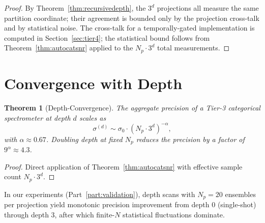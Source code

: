\documentclass[twocolumn,11pt,a4paper]{article}
\theoremstyle{thmstyle}
\newtheorem{theorem}{Theorem}[section]
\theoremstyle{axiomstyle}
\theoremstyle{definition}
\theoremstyle{remark}
\begin{document}
\begin{proof}
By Theorem~\ref{thm:recursivedepth}, the $3^{d}$ projections all measure the same partition coordinate; their agreement is bounded only by the projection cross-talk and by statistical noise. The cross-talk for a temporally-gated implementation is computed in Section~\ref{sec:tier4}; the statistical bound follows from Theorem~\ref{thm:autocatsnr} applied to the $N_{p}\cdot 3^{d}$ total measurements.
\end{proof}

\section{Convergence with Depth}
\label{sec:tier3converge}

\begin{theorem}[Depth-Convergence]\label{thm:depthconverge}
The aggregate precision of a Tier-3 categorical spectrometer at depth $d$ scales as
\begin{equation}
\sigma^{(d)}\sim\sigma_{0}\cdot(N_{p}\cdot 3^{d})^{-\alpha},
\end{equation}
with $\alpha\approx 0.67$. Doubling depth at fixed $N_{p}$ reduces the precision by a factor of $9^{\alpha}\approx 4.3$.
\end{theorem}

\begin{proof}
Direct application of Theorem~\ref{thm:autocatsnr} with effective sample count $N_{p}\cdot 3^{d}$.
\end{proof}

In our experiments (Part~\ref{part:validation}), depth scans with $N_{p}=20$ ensembles per projection yield monotonic precision improvement from depth 0 (single-shot) through depth 3, after which finite-$N$ statistical fluctuations dominate.
\end{document}
